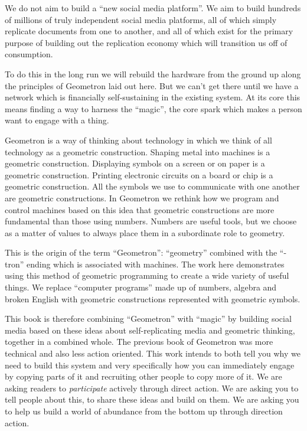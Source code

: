 We do not aim to build a ``new social media platform''. We aim to build
hundreds of millions of truly independent social media platforms, all of
which simply replicate documents from one to another, and all of which
exist for the primary purpose of building out the replication economy
which will transition us off of consumption.

To do this in the long run we will rebuild the hardware from the ground
up along the principles of Geometron laid out here. But we can't get
there until we have a network which is financially self-sustaining in
the existing system. At its core this means finding a way to harness the
``magic'', the core spark which makes a person want to engage with a
thing.

Geometron is a way of thinking about technology in which we think of all
technology as a geometric construction. Shaping metal into machines is a
geometric construction. Displaying symbols on a screen or on paper is a
geometric construction. Printing electronic circuits on a board or chip
is a geometric construction. All the symbols we use to communicate with
one another are geometric constructions. In Geometron we rethink how we
program and control machines based on this idea that geometric
constructions are more fundamental than those using numbers. Numbers are
useful tools, but we choose as a matter of values to always place them
in a subordinate role to geometry.

This is the origin of the term ``Geometron'': ``geometry'' combined with
the ``-tron'' ending which is associated with machines. The work here
demonstrates using this method of geometric programming to create a wide
variety of useful things. We replace ``computer programs'' made up of
numbers, algebra and broken English with geometric constructions
represented with geometric symbols.

This book is therefore combining ``Geometron'' with ``magic'' by
building social media based on these ideas about self-replicating media
and geometric thinking, together in a combined whole. The previous book
of Geometron was more technical and also less action oriented. This work
intends to both tell you why we need to build this system and very
specifically how you can immediately engage by copying parts of it and
recruiting other people to copy more of it. We are asking readers to
\emph{participate} actively through direct action. We are asking you to
tell people about this, to share these ideas and build on them. We are
asking you to help us build a world of abundance from the bottom up
through direction action.

